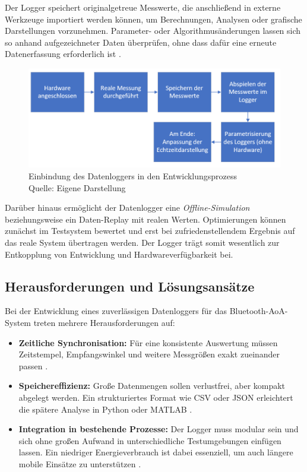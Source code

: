 \documentclass[a4paper, 12pt]{article} %
\begin{document}
Der Logger speichert originalgetreue Messwerte, die anschließend in externe Werkzeuge importiert werden können, um Berechnungen, Analysen oder 
grafische Darstellungen vorzunehmen.  
Parameter- oder Algorithmus­änderungen lassen sich so anhand aufgezeichneter Daten überprüfen, ohne dass dafür eine erneute Datenerfassung 
erforderlich ist \cite{smith2018sensors}.

\begin{figure}[H]
    \centering
    \includegraphics[width=\linewidth]{images/Flussdiagramm Datenlogger.png}
    \caption{Einbindung des Datenloggers in den Entwicklungsprozess\\
             Quelle: Eigene Darstellung}
    \label{fig:datenlogger_flow}
\end{figure}


Darüber hinaus ermöglicht der Datenlogger eine \emph{Offline-Simulation} beziehungsweise ein Daten-Replay mit realen Werten.  
Optimierungen können zunächst im Testsystem bewertet und erst bei zufriedenstellendem Ergebnis auf das reale System übertragen werden.  
Der Logger trägt somit wesentlich zur Entkopplung von Entwicklung und Hardwareverfügbarkeit bei.

\clearpage

\subsection{Herausforderungen und Lösungsansätze}
Bei der Entwicklung eines zuverlässigen Datenloggers für das Bluetooth-\ac{AoA}-System treten mehrere Herausforderungen auf:

\begin{itemize}[leftmargin=2em]
  \item \textbf{Zeitliche Synchronisation:} Für eine konsistente Auswertung müssen Zeitstempel, Empfangswinkel und weitere Messgrößen exakt zueinander passen \cite{rs2022guide}.
  \item \textbf{Speichereffizienz:} Große Datenmengen sollen verlustfrei, aber kompakt abgelegt werden. Ein strukturiertes Format wie \ac{CSV} oder \ac{JSON} erleichtert die spätere Analyse in Python oder MATLAB \cite{dewesoft2024guide}.
  \item \textbf{Integration in bestehende Prozesse:} Der Logger muss modular sein und sich ohne großen Aufwand in unterschiedliche Testumgebungen einfügen lassen. Ein niedriger Energieverbrauch ist dabei essenziell, um auch längere mobile Einsätze zu unterstützen \cite{smith2018sensors}.
\end{itemize}
\end{document}
